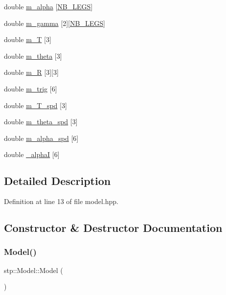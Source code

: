 \begin{DoxyCompactItemize}
double \hyperlink{classstp_1_1_model_a8faca0ba2206f1ac384b80b2223a0c34}{m\+\_\+alpha} \mbox{[}\hyperlink{model_8hpp_ae44092ed043cb4350e2df47fdee890b9}{N\+B\+\_\+\+L\+E\+GS}\mbox{]}
\item 
double \hyperlink{classstp_1_1_model_a60eab0062d4e65c720ed2ac39d51779b}{m\+\_\+gamma} \mbox{[}2\mbox{]}\mbox{[}\hyperlink{model_8hpp_ae44092ed043cb4350e2df47fdee890b9}{N\+B\+\_\+\+L\+E\+GS}\mbox{]}
\item 
double \hyperlink{classstp_1_1_model_a61d8b4957be741fa473468065c2a5d0d}{m\+\_\+T} \mbox{[}3\mbox{]}
\item 
double \hyperlink{classstp_1_1_model_a826586afc60c2c076b271413f5c3e382}{m\+\_\+theta} \mbox{[}3\mbox{]}
\item 
double \hyperlink{classstp_1_1_model_ae1c80dd8cb28d3bd7966c1f289fb291e}{m\+\_\+R} \mbox{[}3\mbox{]}\mbox{[}3\mbox{]}
\item 
double \hyperlink{classstp_1_1_model_afdc7491e9be320ad94775ca046667f9b}{m\+\_\+trig} \mbox{[}6\mbox{]}
\item 
double \hyperlink{classstp_1_1_model_a0ba1c1143089052ffad8133ff40d972f}{m\+\_\+\+T\+\_\+spd} \mbox{[}3\mbox{]}
\item 
double \hyperlink{classstp_1_1_model_aa12970f18bc4258b9ad185f54a9cfe70}{m\+\_\+theta\+\_\+spd} \mbox{[}3\mbox{]}
\item 
double \hyperlink{classstp_1_1_model_a0b4fbb6fdec8106993ddffbd9f61d6ce}{m\+\_\+alpha\+\_\+spd} \mbox{[}6\mbox{]}
\item 
double \hyperlink{classstp_1_1_model_a4679e65c69f376bf8f20f5b80635b79b}{\+\_\+alphaI} \mbox{[}6\mbox{]}
\end{DoxyCompactItemize}


\subsection{Detailed Description}


Definition at line 13 of file model.\+hpp.



\subsection{Constructor \& Destructor Documentation}
\mbox{\label{classstp_1_1_model_a771583e4fa62890a4c86b30ada77a9e5}} 
\subsubsection{\texorpdfstring{Model()}{Model()}\hspace{0.1cm}{\footnotesize\ttfamily [1/2]}}
{\footnotesize\ttfamily stp\+::\+Model\+::\+Model (\begin{DoxyParamCaption}{ }\end{DoxyParamCaption})\hspace{0.3cm}{\ttfamily [inline]}}



